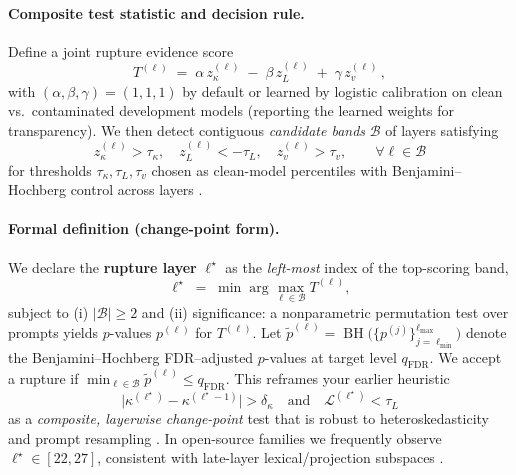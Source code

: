 \documentclass[11pt]{article}
\begin{document}
\paragraph{Composite test statistic and decision rule.}
Define a joint rupture evidence score
\[
T^{(\ell)} \;=\; \alpha\,z_\kappa^{(\ell)} \;-\; \beta\,z_L^{(\ell)} \;+\; \gamma\,z_v^{(\ell)}\,,
\]
with $(\alpha,\beta,\gamma)=(1,1,1)$ by default or learned by logistic calibration on clean vs.\ contaminated development models (reporting the learned weights for transparency). We then detect contiguous \emph{candidate bands} $\mathcal{B}$ of layers satisfying
\[
z_\kappa^{(\ell)}>\tau_\kappa,\quad z_L^{(\ell)}<-\tau_L,\quad z_v^{(\ell)}>\tau_v,\qquad \forall \ell\in\mathcal{B}
\]
for thresholds $\tau_\kappa,\tau_L,\tau_v$ chosen as clean-model percentiles with Benjamini–Hochberg control across layers \citep{benjamini1995fdr,benjamini2001by}.

\paragraph{Formal definition (change-point form).}
We declare the \textbf{rupture layer} $\ell^\star$ as the \emph{left-most} index of the top-scoring band,
\[
\ell^\star \;=\; \min \arg\max_{\ell\in\mathcal{B}} T^{(\ell)} ,
\]
subject to (i) $|\mathcal{B}| \ge 2$ and (ii) significance: a nonparametric permutation test over prompts yields
$p$-values $p^{(\ell)}$ for $T^{(\ell)}$. Let
$\tilde p^{(\ell)}=\operatorname{BH}\!\big(\{p^{(j)}\}_{j=\ell_{\min}}^{\ell_{\max}}\big)$
denote the Benjamini–Hochberg FDR–adjusted $p$-values at target level $q_{\mathrm{FDR}}$.
We accept a rupture if $\min_{\ell\in\mathcal{B}} \tilde p^{(\ell)} \le q_{\mathrm{FDR}}$.
This reframes your earlier heuristic
\[
\big|\kappa^{(\ell^\star)}-\kappa^{(\ell^\star-1)}\big| > \delta_\kappa
\quad\text{and}\quad
\mathcal{L}^{(\ell^\star)} < \tau_L
\]
as a \emph{composite, layerwise change-point} test that is robust to heteroskedasticity and prompt resampling \citep{truong2020cpd}. In open-source families we frequently observe $\ell^\star \in [22,27]$, consistent with late-layer lexical/projection subspaces \citep{raghu2017svcca,kornblith2019cka,ansuini2019intrinsic}.
\end{document}
